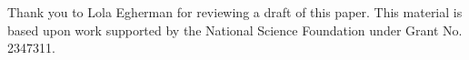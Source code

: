 Thank you to Lola Egherman for reviewing a draft of this paper. This material is based upon work supported by the National Science Foundation under Grant No. 2347311.